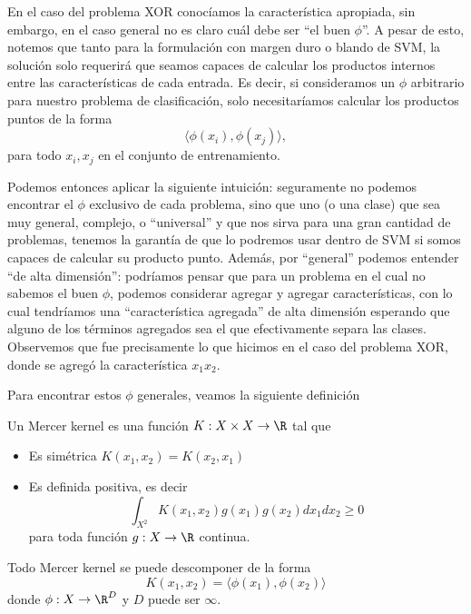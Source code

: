 \begin{remark}
En el caso del problema XOR conocíamos la característica apropiada, sin embargo, en el caso general no es claro cuál debe ser ``el buen $\phi$''. A pesar de esto, notemos que tanto para la formulación con margen duro o blando de SVM, la solución solo requerirá que seamos capaces de calcular los productos internos entre las características de cada entrada. Es decir, si consideramos un $\phi$ arbitrario para nuestro problema de clasificación, solo necesitaríamos calcular los productos puntos de la forma
\begin{equation}
    \langle \phi(x_i) , \phi(x_j) \rangle, 
\end{equation}
para todo $x_i,x_j$ en el conjunto de entrenamiento. 
\end{remark}

Podemos entonces aplicar la siguiente intuición: seguramente no podemos encontrar el $\phi$ exclusivo de cada problema, sino que uno (o una clase) que sea muy general, complejo, o ``universal'' y que nos sirva para una gran cantidad de problemas, tenemos la garantía de que lo podremos usar dentro de SVM si somos capaces de calcular su producto punto. Además, por ``general'' podemos entender ``de alta dimensión'': podríamos pensar que para un problema en el cual no sabemos el buen $\phi$, podemos considerar agregar y agregar características, con lo cual tendríamos una ``característica agregada'' de alta dimensión esperando que alguno de los términos agregados sea el que efectivamente separa las clases. Observemos que fue precisamente lo que hicimos en el caso del problema XOR, donde se agregó la característica $x_1x_2$. 

Para encontrar estos $\phi$ generales, veamos la siguiente definición
\begin{definition}
    Un Mercer kernel es una función $K: X\times X \to \R$ tal que
\begin{itemize}
    \item Es simétrica $K(x_1 , x_2 ) = K (x_2 , x_1)$
    \item Es definida positiva, es decir
    $$\int_{X^2} K(x_1, x_2)g(x_1) g(x_2) dx_1 dx_2\geq 0$$
    para toda función $g:X\rightarrow\R$ continua. 
\end{itemize}

\end{definition}

\begin{lemma}
    Todo Mercer kernel se puede descomponer de la forma
\begin{equation}
    K(x_1, x_2) = \langle \phi(x_1) , \phi(x_2) \rangle
\end{equation}
donde $\phi: X \to \R^D$ y $D$ puede ser $\infty$.

\end{lemma}


